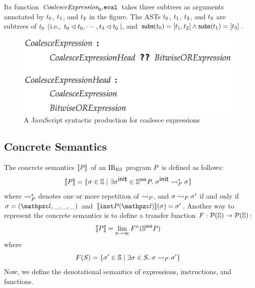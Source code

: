 \documentclass[10pt,conference]{IEEEtran}
\begin{document}
\noindent Its  function $\essyn{CoalesceExpression}_0.\eval$
takes three subtrees as arguments annotated by $t_0$, $t_1$, and
$t_2$ in the figure. The ASTs $t_0$, $t_1$, $t_2$, and $t_3$
are subtrees of $t_0$ (i.e., $t_0 \lhd t_0, \cdots, t_3
\lhd t_0$), and $\getsubs(\tree_0) = [\tree_1, \tree_2] \wedge
\getsubs(\tree_1) = [\tree_3]$.


\begin{figure}
  \centering
  \includegraphics[width=.8\columnwidth]{img/coalesce-prod.png}
  \caption{A JavaScript syntactic production for coalesce expressions}
  \label{fig:coalesce-prod}
\end{figure}




\subsection{Concrete Semantics}

The concrete semantics $\llbracket{P}\rrbracket$ of an $\text{IR}_\text{ES}$ program $P$ is defined as
follows:
\[
  \sem{\prog} = \{ \st \in \stset \mid \exists \initst \in \initstset{\prog}. \;
  \initst \trans{\prog}^* \st \}
\]
where $\leadsto_{P}^*$ denotes one or more repetition of $\leadsto_{P}$, and
$\sigma \leadsto_{P} \sigma'$ if and only if $\st = (\lab, \_, \_, \_)$ and
$\sem{\getinst{\prog}(\lab)}(\st) = \st'$. Another way to represent the concrete
semantics is to define a transfer function $F: \mathcal{P}(\mathbb{S})
\rightarrow \mathcal{P}(\mathbb{S})$:
\[
  \llbracket{P}\rrbracket = \lim_{n \rightarrow \infty}F^n(\mathbb{S}^{\textsf{init}}{P})
\]
where
\begin{equation}\label{eqn:transfer}
  \transfer(S) = \{ \st' \in \stset \mid \exists \st \in S. \; \st \trans{\prog}
  \st' \}
\end{equation}
Now, we define the denotational semantics of expressions, instructions, and
functions.
\end{document}
